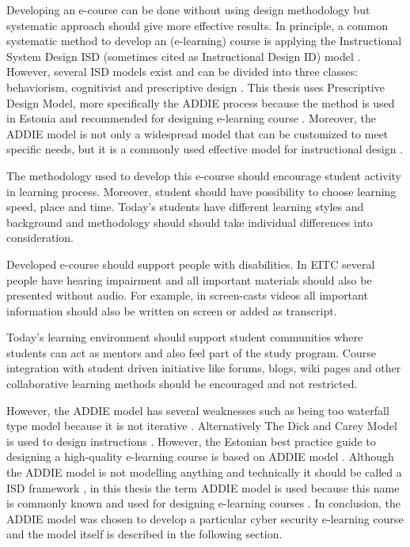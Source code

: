Developing an e-course can be done without using design methodology but systematic approach should give more effective results. In principle, a common systematic method to develop an (e-learning) course is applying the Instructional System Design \gls{ISD} (sometimes cited as  Instructional Design \gls{ID}) model \citep{website:id_models}. However, several \gls{ISD} models exist and can be divided into three classes: behaviorism, cognitivist and prescriptive design \citep{website:id_models}. This thesis uses Prescriptive Design Model, more specifically the \gls{ADDIE} process because the method is used in Estonia and recommended for designing e-learning course \citep[p.~5]{OppeArenduskeskus2010}. Moreover, the \gls{ADDIE} model is not only a widespread model that can be customized to meet specific needs, but it is a commonly used effective model for instructional  design \citep{ieee_addie_1607206}.

The methodology used to develop this e-course should encourage student activity in learning process. Moreover, student should have possibility to choose learning speed, place and time. Today's students have different learning styles and background and methodology should should take individual differences into consideration.

Developed e-course should support people with disabilities. In \gls{EITC} several people have hearing impairment and all important materials should also be presented without audio. For example, in screen-casts videos all important information should also be written on screen or added as transcript.

Today’s learning environment should support student communities where students can act as mentors and also feel part of the study program. Course integration with student driven initiative like forums, blogs, wiki pages and other collaborative learning methods should be encouraged and not restricted.

 However, the \gls{ADDIE} model has several weaknesses such as being too waterfall type model because it is not iterative \citep{website:weakesses_of_ADDIE_model}. Alternatively The Dick and Carey Model is used to design instructions \citep{dick2005systematic}. However, the Estonian best practice guide to designing a high-quality e-learning course is based on \gls{ADDIE} model \citep{OppeArenduskeskus2010}. Although the \gls{ADDIE} model is not modelling anything and technically it should be called a \gls{ISD} framework \citep{bichelmeyer2004addie}, in this thesis the term \gls{ADDIE} model is used because this name is commonly known and used for designing e-learning courses \citep{bichelmeyer2004addie, OppeArenduskeskus2010}.
In conclusion, the \gls{ADDIE} model was chosen to develop a particular cyber security e-learning course and the model itself is described in the following section.

